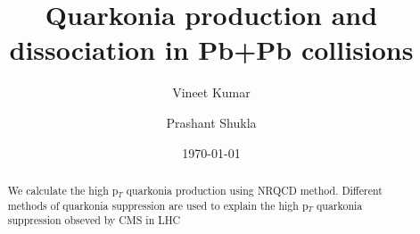 \documentclass[aps,prc,preprint,superscriptaddress,showpacs,showkeys,amsmath]{revtex4-1}
\begin{document}
\newcommand{\Jpsi}{J/\psi}
\newcommand{\pT}{p_{T}}
\newcommand{\calO}{{\cal{O}}}
\newcommand{\barQ}{{\bar{Q}}}
\newcommand{\barc}{{\bar{c}}}
\newcommand{\barb}{{\bar{b}}}
\newcommand{\baru}{\bar{u}}
\newcommand{\barv}{\bar{v}}
\newcommand{\barup}{\bar{u}_{+}}
\newcommand{\barum}{\bar{u}_{-}}
\newcommand{\barvp}{\bar{v}_{+}}
\newcommand{\barvm}{\bar{v}_{-}}
\newcommand{\charm}{{\rm{charm}}}
\newcommand{\bottom}{{\rm{bottom}}}

\newcommand{\cs}{{\hat{s}}}
\newcommand{\ct}{{\hat{t}}}
\newcommand{\cu}{{\hat{u}}}
\newcommand{\alphas}{{\alpha_{s}}}




\title{{\Large Quarkonia production and dissociation in Pb+Pb collisions}} 
\author{\large Vineet Kumar}
\author{\large Prashant Shukla}

\date{\today}

\begin{abstract}
  We calculate the high p$_{T}$ quarkonia production using NRQCD method.
  Different methods of quarkonia suppression are used to explain the high
  p$_{T}$ quarkonia suppression obseved by CMS in LHC
\end{abstract}


\maketitle

\end{document}
